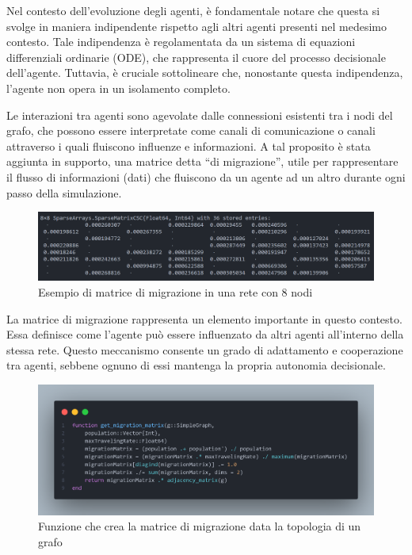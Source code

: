 Nel contesto dell'evoluzione degli agenti, è fondamentale notare che 
questa si svolge in maniera indipendente rispetto agli altri agenti 
presenti nel medesimo contesto. Tale indipendenza è regolamentata da un 
sistema di equazioni differenziali ordinarie (ODE), che rappresenta il 
cuore del processo decisionale dell'agente. 
Tuttavia, è cruciale sottolineare che, nonostante questa indipendenza, 
l'agente non opera in un isolamento completo.

Le interazioni tra agenti sono agevolate dalle connessioni esistenti 
tra i nodi del grafo, che possono essere interpretate come canali di 
comunicazione o canali attraverso i quali fluiscono influenze e 
informazioni. A tal proposito è stata aggiunta in supporto, una matrice
detta ``di migrazione'', utile per rappresentare il flusso di informazioni 
(dati) che fluiscono da un agente ad un altro durante ogni passo della
simulazione. 

\begin{figure}[H]
    \begin{center}
		\includegraphics[width=\textwidth]{img/Screenshot 2023-10-16 110330.png}
		\caption{Esempio di matrice di migrazione in una rete con 8 nodi}
		\label{fig:Migration_Matrix_example}
	\end{center}
\end{figure}

La matrice di migrazione rappresenta un elemento 
importante in questo contesto. Essa definisce come l'agente può essere 
influenzato da altri agenti all'interno della stessa rete. 
Questo meccanismo consente un grado di adattamento e cooperazione tra 
agenti, sebbene ognuno di essi mantenga la propria autonomia decisionale.

\begin{figure}[H]
    \begin{center}
		\includegraphics[width=\textwidth]{img/mmfunc.png}
		\caption{Funzione che crea la matrice di migrazione data la topologia di un grafo}
		\label{fig:migration_matrix_function}
	\end{center}
\end{figure}

